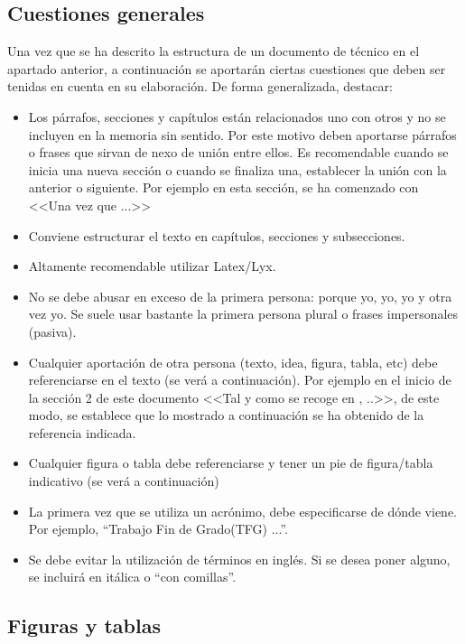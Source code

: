 \begin{list}
\section{Cuestiones generales}

Una vez que se ha descrito la estructura de un documento de técnico
en el apartado anterior, a continuación se aportarán ciertas cuestiones
que deben ser tenidas en cuenta en su elaboración. De forma generalizada,
destacar:
\begin{itemize}
\item Los párrafos, secciones y capítulos están relacionados uno con otros
y no se incluyen en la memoria sin sentido. Por este motivo deben
aportarse párrafos o frases que sirvan de nexo de unión entre ellos.
Es recomendable cuando se inicia una nueva sección o cuando se finaliza
una, establecer la unión con la anterior o siguiente. Por ejemplo
en esta sección, se ha comenzado con <<Una vez que ...>>
\item Conviene estructurar el texto en capítulos, secciones y subsecciones. 
\item Altamente recomendable utilizar Latex/Lyx. 
\item No se debe abusar en exceso de la primera persona: porque yo, yo,
yo y otra vez yo. Se suele usar bastante la primera persona plural
o frases impersonales (pasiva).
\item Cualquier aportación de otra persona (texto, idea, figura, tabla,
etc) debe referenciarse en el texto (se verá a continuación). Por
ejemplo en el inicio de la sección 2 de este documento <<Tal y como
se recoge en \cite{tfg_alicante}, ..>>, de este modo, se establece
que lo mostrado a continuación se ha obtenido de la referencia indicada. 
\item Cualquier figura o tabla debe referenciarse y tener un pie de figura/tabla
indicativo (se verá a continuación)
\item La primera vez que se utiliza un acrónimo, debe especificarse de dónde
viene. Por ejemplo, \textquotedblleft Trabajo Fin de Grado(TFG) ...\textquotedblright . 
\item Se debe evitar la utilización de términos en inglés. Si se desea poner
alguno, se incluirá en itálica o \textquotedblleft con comillas\textquotedblright . 
\end{itemize}

\subsection{Figuras y tablas}


\end{list}
